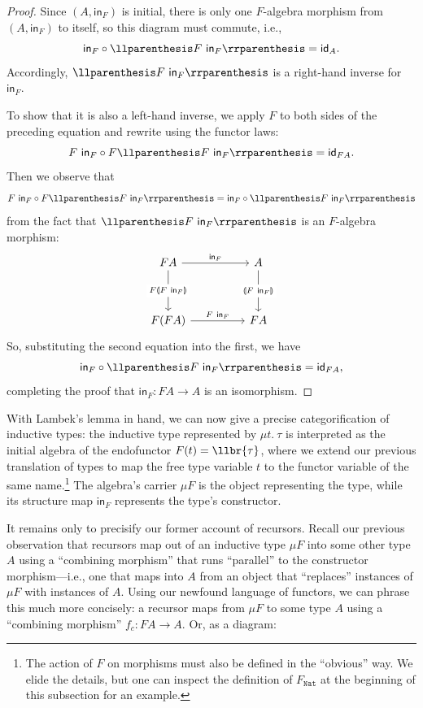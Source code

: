 \begin{proof}
  Since $(A, \mathsf{in}_F)$ is initial, there is only one $F$-algebra morphism from $(A,
  \mathsf{in}_F)$ to itself, so this diagram must commute, i.e.,
  \[ \mathsf{in}_F \circ \llpr{F~\mathsf{in}_F} = \mathsf{id}_A.\]
  Accordingly, $\llpr{F~\mathsf{in}_F}$ is a right-hand inverse for $\mathsf{in}_F$.
  
  To show that it is also a left-hand inverse, we apply $F$ to both sides of the preceding equation
  and rewrite using the functor laws:
  \[ F~\mathsf{in}_F \circ F \llpr{F~\mathsf{in}_F} = \mathsf{id}_{F A}. \]
  Then we observe that
  \[ F~\mathsf{in}_F \circ F \llpr{F~\mathsf{in}_F} = \mathsf{in}_F \circ \llpr{F~\mathsf{in}_F} \]
  from the fact that $\llpr{F~\mathsf{in}_F}$ is an $F$-algebra morphism:
  \[\begin{tikzcd}
    {F A} && A \\
    \\
    {F (F A)} && {F A}
    \arrow["{\mathsf{in}_F}", from=1-1, to=1-3]
    \arrow["{F \llpr{F~\mathsf{in}_F}}"{description}, from=1-1, to=3-1]
    \arrow["{\llpr{F~\mathsf{in}_F}}"{description}, from=1-3, to=3-3]
    \arrow["{F~\mathsf{in}_F}", from=3-1, to=3-3]
  \end{tikzcd}\]
  So, substituting the second equation into the first, we have
  \[ \mathsf{in}_F \circ \llpr{F~\mathsf{in}_F} = \mathsf{id}_{F A}, \]
  completing the proof that $\mathsf{in}_F : F A \to A$ is an isomorphism.
\end{proof}

With Lambek's lemma in hand, we can now give a precise categorification of inductive types: the
inductive type represented by $\mu t.~\tau$ is interpreted as the initial algebra of the endofunctor
$F(t) = \llbr{\tau}$, where we extend our previous translation of types to map the free type
variable $t$ to the functor variable of the same name.\footnote{The action of $F$ on morphisms must
also be defined in the ``obvious'' way. We elide the details, but one can inspect the definition of
$F_\texttt{Nat}$ at the beginning of this subsection for an example.} The algebra's carrier $\mu F$
is the object representing the type, while its structure map $\mathsf{in}_F$ represents the type's
constructor.

It remains only to precisify our former account of recursors. Recall our previous observation that
recursors map out of an inductive type $\mu F$ into some other type $A$ using a ``combining
morphism'' that runs ``parallel'' to the constructor morphism---i.e., one that maps into $A$ from an
object that ``replaces'' instances of $\mu F$ with instances of $A$. Using our newfound language of
functors, we can phrase this much more concisely: a recursor maps from $\mu F$ to some type $A$
using a ``combining morphism'' $f_c : F A \to A$. Or, as a diagram:

